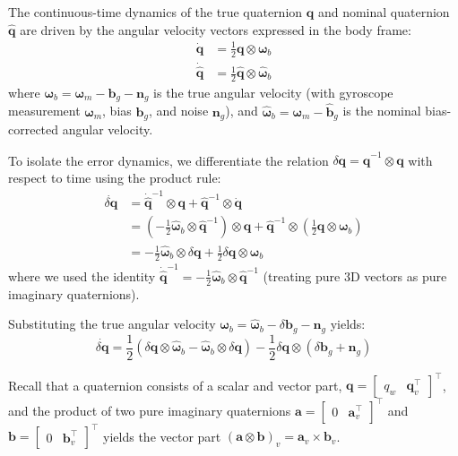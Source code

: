 \documentclass{article}
\begin{document}
	The continuous-time dynamics of the true quaternion $\mathbf{q}$ and nominal quaternion $\hat{\mathbf{q}}$ are driven by the angular velocity vectors expressed in the body frame:
	\begin{align*}
		\dot{\mathbf{q}} &= \frac{1}{2} \mathbf{q} \otimes \bm{\omega}_b \\
		\dot{\hat{\mathbf{q}}} &= \frac{1}{2} \hat{\mathbf{q}} \otimes \hat{\bm{\omega}}_b
	\end{align*}
	where $\bm{\omega}_b = \bm{\omega}_m - \mathbf{b}_g - \mathbf{n}_g$ is the true angular velocity (with gyroscope measurement $\bm{\omega}_m$, bias $\mathbf{b}_g$, and noise $\mathbf{n}_g$), and $\hat{\bm{\omega}}_b = \bm{\omega}_m - \hat{\mathbf{b}}_g$ is the nominal bias-corrected angular velocity.
	
	To isolate the error dynamics, we differentiate the relation $\delta\mathbf{q} = \hat{\mathbf{q}}^{-1} \otimes \mathbf{q}$ with respect to time using the product rule:
	\begin{align*}
		\dot{\delta\mathbf{q}} &= \dot{\hat{\mathbf{q}}}^{-1} \otimes \mathbf{q} + \hat{\mathbf{q}}^{-1} \otimes \dot{\mathbf{q}} \\
		&= \left( -\frac{1}{2} \hat{\bm{\omega}}_b \otimes \hat{\mathbf{q}}^{-1} \right) \otimes \mathbf{q} + \hat{\mathbf{q}}^{-1} \otimes \left( \frac{1}{2} \mathbf{q} \otimes \bm{\omega}_b \right) \\
		&= -\frac{1}{2} \hat{\bm{\omega}}_b \otimes \delta\mathbf{q} + \frac{1}{2} \delta\mathbf{q} \otimes \bm{\omega}_b
	\end{align*}
	where we used the identity $\dot{\hat{\mathbf{q}}}^{-1} = -\frac{1}{2} \hat{\bm{\omega}}_b \otimes \hat{\mathbf{q}}^{-1}$ (treating pure 3D vectors as pure imaginary quaternions).
	
	Substituting the true angular velocity $\bm{\omega}_b = \hat{\bm{\omega}}_b - \delta\mathbf{b}_g - \mathbf{n}_g$ yields:
	\begin{equation*}
		\dot{\delta\mathbf{q}} = \frac{1}{2} \left( \delta\mathbf{q} \otimes \hat{\bm{\omega}}_b - \hat{\bm{\omega}}_b \otimes \delta\mathbf{q} \right) - \frac{1}{2} \delta\mathbf{q} \otimes (\delta\mathbf{b}_g + \mathbf{n}_g)
	\end{equation*}
	
	Recall that a quaternion consists of a scalar and vector part, $\mathbf{q} = \begin{bmatrix} q_w & \mathbf{q}_v^\top \end{bmatrix}^\top$, and the product of two pure imaginary quaternions $\mathbf{a} = \begin{bmatrix} 0 & \mathbf{a}_v^\top \end{bmatrix}^\top$ and $\mathbf{b} = \begin{bmatrix} 0 & \mathbf{b}_v^\top \end{bmatrix}^\top$ yields the vector part $(\mathbf{a} \otimes \mathbf{b})_v = \mathbf{a}_v \times \mathbf{b}_v$.
	
\end{document}
